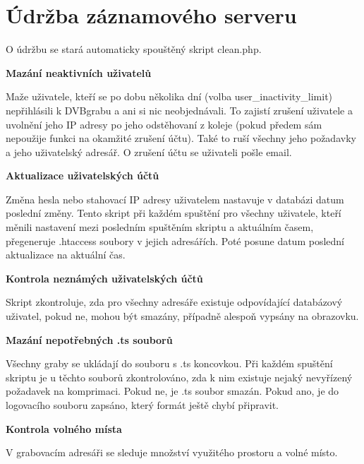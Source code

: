 
\section{Údržba záznamového serveru}

O údržbu se stará automaticky spouštěný skript clean.php.

\vspace{10pt}

\textbf{Mazání neaktivních uživatelů}

Maže uživatele, kteří se po dobu několika dní (volba user\_inactivity\_limit) nepřihlásili k DVBgrabu a ani si nic neobjednávali. To zajistí zrušení uživatele a uvolnění jeho IP adresy po jeho odstěhovaní z koleje (pokud předem sám nepoužije funkci na okamžité zrušení účtu). Také to ruší všechny jeho požadavky a jeho uživatelský adresář. O zrušení účtu se uživateli pošle email.

\vspace{10pt}

\textbf{Aktualizace uživatelských účtů}

Změna hesla nebo stahovací IP adresy uživatelem nastavuje v databázi datum poslední změny. Tento skript při každém spuštění pro všechny uživatele, kteří měnili nastavení mezi posledním spuštěním skriptu a aktuálním časem, přegeneruje .htaccess soubory v jejich adresářích. Poté posune datum poslední aktualizace na aktuální čas.

\vspace{10pt}

\textbf{Kontrola neznámých uživatelských účtů}

Skript zkontroluje, zda pro všechny adresáře existuje odpovídající databázový uživatel, pokud ne, mohou být smazány, případně alespoň vypsány na obrazovku.

\vspace{10pt}

\textbf{Mazání nepotřebných .ts souborů}

Všechny graby se ukládají do souboru s .ts koncovkou. Při každém spuštění skriptu je u těchto souborů zkontrolováno, zda k nim existuje nejaký nevyřízený požadavek na komprimaci. Pokud ne, je .ts soubor smazán. Pokud ano, je do logovacího souboru zapsáno, který formát ještě chybí připravit.

\vspace{10pt}

\textbf{Kontrola volného místa}

V grabovacím adresáři se sleduje množství využitého prostoru a volné místo. 

